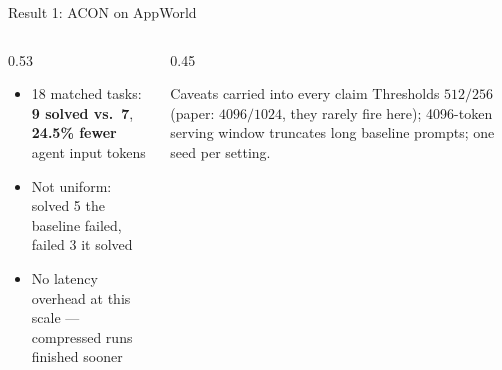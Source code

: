 \documentclass[usenames,dvipsnames,aspectratio=169,10pt]{beamer}
\begin{document}
\begin{frame}{Result 1: ACON on AppWorld}
\vspace{0.2cm}
\begin{columns}[T]
\begin{column}{0.53\textwidth}
\scriptsize
\begin{itemize}
  \item 18 matched tasks: \textbf{9 solved vs.\ 7}, \textbf{24.5\% fewer}
        agent input tokens
  \item Not uniform: solved 5 the baseline failed, failed 3 it solved
  \item No latency overhead at this scale --- compressed runs finished sooner
\end{itemize}
\end{column}
\begin{column}{0.45\textwidth}
\begin{alertblock}{Caveats carried into every claim}
\scriptsize
Thresholds $512/256$ (paper: $4096/1024$, they rarely fire here);
4096-token serving window truncates long baseline prompts;
one seed per setting.
\end{alertblock}
\end{column}
\end{columns}
\end{frame}
\end{document}
